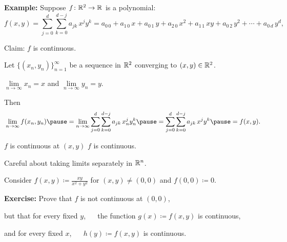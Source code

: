 \documentclass[10pt,aspectratio=149]{beamer}
\begin{document}
\begin{frame}

\textbf{Example:}
Suppose $f \colon {\mathbb{R}}^2 \to {\mathbb{R}}$ is a polynomial:
\begin{equation*}
f(x,y) =
\sum_{j=0}^d
\sum_{k=0}^{d-j}
a_{jk}\,x^jy^k =
a_{0\,0} + a_{1\,0} \, x +
a_{0\,1} \, y+  
a_{2\,0} \, x^2+  
a_{1\,1} \, xy+  
a_{0\,2} \, y^2+ \cdots +
a_{0\,d} \, y^d ,
\end{equation*}

\pause
Claim: $f$ is continuous.

\pause
\medskip

Let $\bigl\{ (x_n,y_n) \bigr\}_{n=1}^\infty$ be a sequence in ${\mathbb{R}}^2$
converging to $(x,y) \in {\mathbb{R}}^2$.

\pause
\thus \quad
$\lim\limits_{n\to\infty} x_n = x$ and $\lim\limits_{n\to\infty} y_n = y$.

\pause
\medskip

Then
\[
\lim_{n\to\infty}
f(x_n,y_n)
\pause
=
\lim_{n\to\infty}
\sum_{j=0}^d
\sum_{k=0}^{d-j}
a_{jk} \, x_n^jy_n^k 
\pause
=
\sum_{j=0}^d
\sum_{k=0}^{d-j}
a_{jk} \, x^jy^k
\pause
=
f(x,y) .
\]

\pause
\thus \quad $f$ is continuous at $(x,y)$
\pause
\wthus $f$ is continuous.

\end{frame}

\begin{frame}

Careful about taking limits separately in ${\mathbb{R}}^n$.

\pause

Consider $f(x,y) \coloneqq \frac{xy}{x^2+y^2}$ for $(x,y) \not= (0,0)$ and
$f(0,0) \coloneqq 0$.

\pause
\begin{center}
\end{center}

\pause
\textbf{Exercise:} Prove that $f$ is not continuous at $(0,0)$,

\pause
but that for every fixed $y$, ~~ the function $g(x) \coloneqq f(x,y)$ is
continuous,

\pause
and for every fixed $x$, ~~ $h(y) \coloneqq f(x,y)$ is continuous.


\end{frame}
\end{document}
